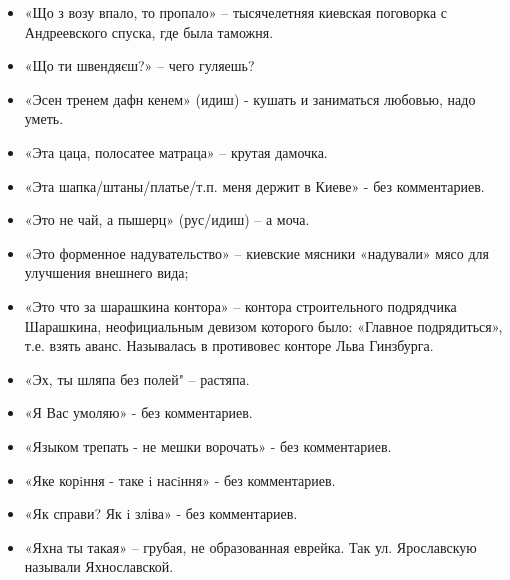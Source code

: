 \begin{itemize}
\item  «Що з возу впало, то пропало» – тысячелетняя киевская поговорка с Андреевского спуска, где была таможня.
\item  «Що ти швендяєш?» – чего гуляешь?
\item  «Эсен тренем дафн кенем» (идиш) - кушать и заниматься любовью, надо уметь.
\item  «Эта цаца, полосатее матраца» – крутая дамочка.
\item  «Эта шапка/штаны/платье/т.п. меня держит в Киеве» - без комментариев.
\item  «Это не чай, а пышерц» (рус/идиш) – а моча.
\item  «Это форменное надувательство» – киевские мясники «надували» мясо для улучшения внешнего вида;
\item  «Это что за шарашкина контора» – контора строительного подрядчика Шарашкина, неофициальным девизом которого было: «Главное подрядиться», т.е. взять аванс. Называлась в противовес конторе Льва Гинзбурга.
\item  «Эх, ты шляпа без полей" – растяпа.
\item  «Я Вас умоляю» - без комментариев.
\item  «Языком трепать - не мешки ворочать» - без комментариев.
\item  «Яке корiння - таке i насiння» - без комментариев.
\item  «Як справи? Як i зліва» - без комментариев.
\item  «Яхна ты такая» – грубая, не образованная еврейка. Так ул. Ярославскую называли Яхнославской.
\end{itemize}
